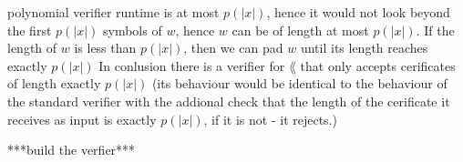 polynomial verifier runtime is at most $p(|x|)$, hence it would not look beyond the first $p(|x|)$ symbols of $w$,
hence $w$ can be of length at most $p(|x|)$.
If the length of $w$ is less than $p(|x|)$, then we can pad $w$ until its length reaches exactly $p(|x|)$
In conlusion there is a verifier for $\lang$ that only accepts cerificates of length exactly $p(|x|)$
(its behaviour would be identical to the behaviour of the standard verifier with the addional check
that the length of the cerificate it receives as input is exactly $p(|x|)$, if it is not - it rejects.)

***build the verfier***